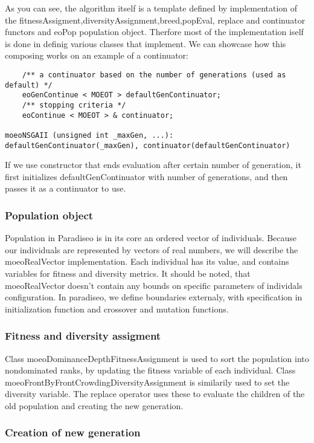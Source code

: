 \documentclass[12pt,oneside,draft]{fithesis2}
\begin{document}
As you can see, the algorithm itself is a template defined by implementation of the fitnessAssigment,diversityAssignment,breed,popEval, replace and continuator functors and eoPop population object. Therfore most of the implementation iself is done in definig various classes that implement. We can showcase how this composing works on an example of a continuator:

\begin{lstlisting}
    /** a continuator based on the number of generations (used as default) */
    eoGenContinue < MOEOT > defaultGenContinuator;
    /** stopping criteria */
    eoContinue < MOEOT > & continuator;

moeoNSGAII (unsigned int _maxGen, ...):
defaultGenContinuator(_maxGen), continuator(defaultGenContinuator)
\end{lstlisting}

If we use constructor that ends evaluation after certain number of generation, it first initializes defaultGenContinuator with number of generations, and then passes it as a continuator to use. 

\subsubsection{Population object}
Population in Paradiseo is in its core an ordered vector of individuals. Because our individuals are represented by vectors of real numbers, we will describe the moeoRealVector implementation. Each individual has its value, and contains variables for fitness and diversity metrics. It should be noted, that moeoRealVector doesn't contain any bounds on specific parameters of individals configuration. In paradiseo, we define boundaries externaly, with specification in initialization function and crossover and mutation functions. 

\subsubsection{Fitness and diversity assigment}

Class moeoDominanceDepthFitnessAssignment is used to sort the population into nondominated ranks, by updating the fitness variable of each individual. Class moeoFrontByFrontCrowdingDiversityAssignment is similarily used to set the diversity variable. The replace operator uses these to evaluate the children of the old population and creating the new generation.

\subsubsection{Creation of new generation}
\end{document}
